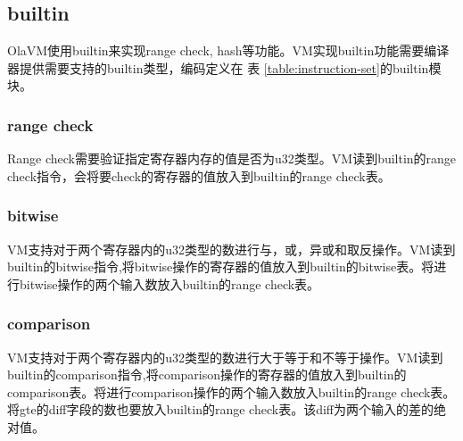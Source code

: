 \subsection{builtin}\label{subsec: processor-instructions-builtin}
OlaVM使用builtin来实现range check, hash等功能。VM实现builtin功能需要编译器提供需要支持的builtin类型，编码定义在 表 \ref{table:instruction-set}的builtin模块。

\subsubsection{range check}
Range check需要验证指定寄存器内存的值是否为u32类型。VM读到builtin的range check指令，会将要check的寄存器的值放入到builtin的range check表。

\subsubsection{bitwise}
VM支持对于两个寄存器内的u32类型的数进行与，或，异或和取反操作。VM读到builtin的bitwise指令,将bitwise操作的寄存器的值放入到builtin的bitwise表。将进行bitwise操作的两个输入数放入builtin的range check表。

\subsubsection{comparison}
VM支持对于两个寄存器内的u32类型的数进行大于等于和不等于操作。VM读到builtin的comparison指令,将comparison操作的寄存器的值放入到builtin的comparison表。将进行comparison操作的两个输入数放入builtin的range check表。
将gte的diff字段的数也要放入builtin的range check表。该diff为两个输入的差的绝对值。

